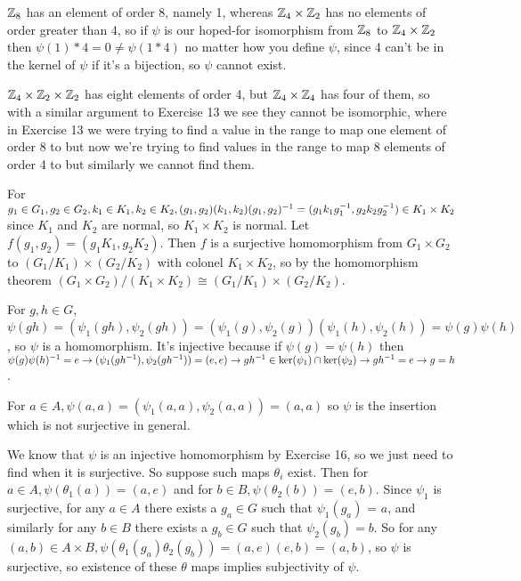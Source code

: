 \documentclass[11pt, oneside]{article}   	%
\begin{document}
\item $\mathbb{Z}_8$ has an element of order 8, namely 1, whereas $\mathbb{Z}_4 \times \mathbb{Z}_2$ has no elements of order greater than 4, so if $\psi$ is our hoped-for isomorphism from $\mathbb{Z}_8$ to $\mathbb{Z}_4 \times \mathbb{Z}_2$ then $\psi(1)*4 = 0 \not = \psi(1 * 4)$ no matter how you define $\psi$, since 4 can't be in the kernel of $\psi$ if it's a bijection, so $\psi$ cannot exist.
\item $\mathbb{Z}_4 \times \mathbb{Z}_2 \times \mathbb{Z}_2$ has eight elements of order 4, but $\mathbb{Z}_4 \times \mathbb{Z}_4$ has four of them, so with a similar argument to Exercise 13 we see they cannot be isomorphic, where in Exercise 13 we were trying to find a value in the range to map one element of order 8 to but now we're trying to find values in the range to map 8 elements of order 4 to but similarly we cannot find them.
\item For $g_1 \in G_1, g_2 \in G_2, k_1 \in K_1, k_2 \in K_2, (g_1, g_2)(k_1, k_2)(g_1, g_2)^{-1} = (g_1k_1g_1^{-1}, g_2k_2g_2^{-1}) \in K_1 \times K_2$ since $K_1$ and $K_2$ are normal, so $K_1 \times K_2$ is normal. Let $f(g_1, g_2) = (g_1K_1, g_2K_2)$. Then $f$ is a surjective homomorphism from $G_1 \times G_2$ to $(G_1 / K_1) \times (G_2 / K_2)$ with colonel $K_1 \times K_2$, so by the homomorphism theorem $(G_1 \times G_2) / (K_1 \times K_2) \cong (G_1 / K_1) \times (G_2 / K_2)$.
\item \be
\item For $g, h \in G$, $\psi(gh) = (\psi_1(gh), \psi_2(gh)) = (\psi_1(g), \psi_2(g))(\psi_1(h), \psi_2(h)) = \psi(g)\psi(h)$, so $\psi$ is a homomorphism. It's injective because if $\psi(g) = \psi(h)$ then $\psi(g)\psi(h)^{-1} = e \rightarrow (\psi_1(gh^{-1}), \psi_2(gh^{-1})) = (e, e) \rightarrow gh^{-1} \in \ker(\psi_1) \cap \ker(\psi_2) \rightarrow gh^{-1} = e \rightarrow g = h$.
\item For $a \in A, \psi(a, a) = (\psi_1(a, a), \psi_2(a, a)) = (a, a)$ so $\psi$ is the insertion which is not surjective in general.
\ee
\item We know that $\psi$ is an injective homomorphism by Exercise 16, so we just need to find when it is surjective. So suppose such maps $\theta_i$ exist. Then for $a \in A, \psi(\theta_1(a)) = (a, e)$ and for $b \in B, \psi(\theta_2(b)) = (e, b)$. Since $\psi_1$ is surjective, for any $a \in A$ there exists a $g_a \in G$ such that $\psi_1(g_a)$ = $a$, and similarly for any $b \in B$ there exists a $g_b \in G$ such that $\psi_2(g_b) = b$. So for any $(a, b) \in A \times B, \psi(\theta_1(g_a)\theta_2(g_b)) = (a, e)(e, b) = (a, b)$, so $\psi$ is surjective, so existence of these $\theta$ maps implies subjectivity of $\psi$. \\
\end{document}
